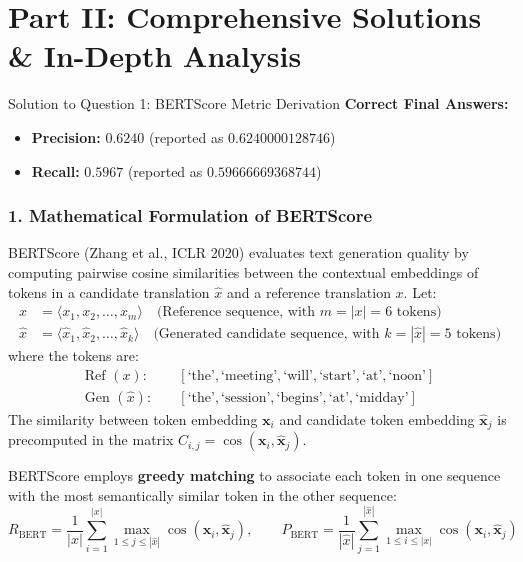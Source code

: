 \documentclass[11pt,a4paper]{article}
\begin{document}
\section*{Part II: Comprehensive Solutions \& In-Depth Analysis}

\begin{solutionbox}{Solution to Question 1: BERTScore Metric Derivation}
\textbf{Correct Final Answers:}
\begin{itemize}[itemsep=2pt]
    \item \textbf{Precision:} $0.6240$ (reported as $0.6240000128746$)
    \item \textbf{Recall:} $0.5967$ (reported as $0.59666669368744$)
\end{itemize}

\subsubsection*{1. Mathematical Formulation of BERTScore}
BERTScore (Zhang et al., ICLR 2020) evaluates text generation quality by computing pairwise cosine similarities between the contextual embeddings of tokens in a candidate translation $\hat{x}$ and a reference translation $x$. Let:
\begin{align*}
    x &= \langle x_1, x_2, \dots, x_m \rangle \quad \text{(Reference sequence, with } m = |x| = 6 \text{ tokens}) \\
    \hat{x} &= \langle \hat{x}_1, \hat{x}_2, \dots, \hat{x}_k \rangle \quad \text{(Generated candidate sequence, with } k = |\hat{x}| = 5 \text{ tokens})
\end{align*}
where the tokens are:
\begin{align*}
    \text{Ref } (x): &\quad [\text{`the'}, \text{`meeting'}, \text{`will'}, \text{`start'}, \text{`at'}, \text{`noon'}] \\
    \text{Gen } (\hat{x}): &\quad [\text{`the'}, \text{`session'}, \text{`begins'}, \text{`at'}, \text{`midday'}]
\end{align*}
The similarity between token embedding $\mathbf{x}_i$ and candidate token embedding $\mathbf{\hat{x}}_j$ is precomputed in the matrix $C_{i,j} = \cos(\mathbf{x}_i, \mathbf{\hat{x}}_j)$.

BERTScore employs \textbf{greedy matching} to associate each token in one sequence with the most semantically similar token in the other sequence:
\begin{equation}
    R_{\text{BERT}} = \frac{1}{|x|} \sum_{i=1}^{|x|} \max_{1 \le j \le |\hat{x}|} \cos(\mathbf{x}_i, \mathbf{\hat{x}}_j), \qquad
    P_{\text{BERT}} = \frac{1}{|\hat{x}|} \sum_{j=1}^{|\hat{x}|} \max_{1 \le i \le |x|} \cos(\mathbf{x}_i, \mathbf{\hat{x}}_j)
\end{equation}


\end{solutionbox}
\end{document}
